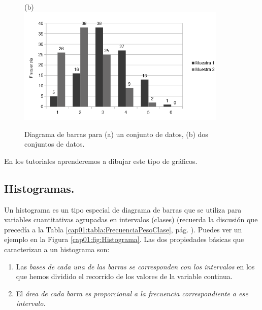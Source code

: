 \begin{figure}[phtb]
\begin{center}
\begin{bn}
    (b)\\
    \includegraphics[width=10cm]{../fig/Cap01-DiagramaBarrasDosMuestras-bn.png}\\[3mm]
	\end{bn}
	\caption{Diagrama de barras para (a) un conjunto de datos, (b) dos conjuntos de datos.}
	\label{cap01:fig:DiagramaBarras}
    \end{center}
  \end{figure}

En los tutoriales aprenderemos a dibujar este tipo de gráficos.

\pagebreak
\subsection{Histogramas.}
\label{cap01:sec:Histogramas}

Un {\sf histograma}   es un tipo especial de
diagrama   de barras que se utiliza para variables cuantitativas agrupadas en
intervalos (clases) (recuerda la discusión que precedía a la Tabla \ref{cap01:tabla:FrecuenciaPesoClase}, pág.
\pageref{cap01:tabla:FrecuenciaPesoClase}). Puedes ver un ejemplo en la Figura \ref{cap01:fig:Histograma}. Las
dos  propiedades básicas que caracterizan a un histograma son:
    \begin{enumerate}
      \item Las {\em bases de cada una de las barras se corresponden con
      los intervalos} en los que hemos dividido el recorrido de los valores de la
      variable continua.

      \item El {\em área de cada barra es proporcional a la
      frecuencia  correspondiente a ese intervalo.}
    \end{enumerate}

